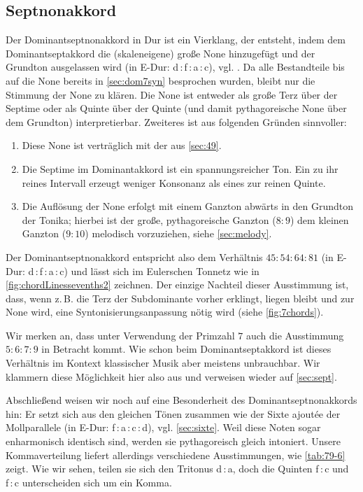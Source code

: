 \subsection{Septnonakkord}
\label{sec:dom79syn}

Der Dominantseptnonakkord in Dur ist ein Vierklang, der entsteht, indem dem
Dominantseptakkord die (skaleneigene) große None hinzugefügt und der Grundton
ausgelassen wird (in \flat E-Dur: d\,:\,f\,:\,\flat a\,:\,c),
vgl. \cite[{}11.3]{Skript}.  Da alle Bestandteile bis auf die None bereits in
\cref{sec:dom7syn} besprochen wurden, bleibt nur die Stimmung der None zu
klären.  Die None ist entweder als große Terz über der Septime oder als Quinte
über der Quinte (und damit pythagoreische None über dem Grundton)
interpretierbar.  Zweiteres ist aus folgenden Gründen sinnvoller:
\begin{enumerate}
  \item Diese None ist verträglich mit der aus \cref{sec:49}.
  \item Die Septime im Dominantakkord ist ein spannungsreicher Ton.  Ein zu ihr
    reines Intervall erzeugt weniger Konsonanz als eines zur reinen Quinte.
  \item Die Auflösung der None erfolgt mit einem Ganzton abwärts in den Grundton
  der Tonika; hierbei ist der große, pythagoreische Ganzton ($8:9$) dem kleinen
  Ganzton ($9:10$) melodisch vorzuziehen, siehe \cref{sec:melody}.
\end{enumerate}
Der Dominantseptnonakkord entspricht also dem Verhältnis $45:54:64:81$ (in \flat
E-Dur: \naturalm d\,:\,f\,:\,\flat a\,:\,c) und lässt sich im Eulerschen Tonnetz
wie in \cref{fig:chordLinessevenths2} zeichnen. Der einzige Nachteil dieser
Ausstimmung ist, dass, wenn z.\,B. die Terz der Subdominante vorher erklingt,
liegen bleibt und zur None wird, eine Syntonisierungsanpassung nötig wird (siehe
\cref{fig:7chords}).

Wir merken an, dass unter Verwendung der Primzahl $7$ auch die Ausstimmung
$5:6:7:9$ in Betracht kommt.  Wie schon beim Dominantseptakkord ist dieses
Verhältnis im Kontext klassischer Musik aber meistens unbrauchbar. Wir klammern
diese Möglichkeit hier also aus und verweisen wieder auf \cref{sec:sept}.

Abschließend weisen wir noch auf eine Besonderheit des Dominantseptnonakkords
hin: Er setzt sich aus den gleichen Tönen zusammen wie der Sixte ajoutée der
Mollparallele (in \flat E-Dur: f\,:\,\flat a\,:\,c\,:\,d),
vgl. \cref{sec:sixte}. Weil diese Noten sogar enharmonisch identisch sind,
werden sie pythagoreisch gleich intoniert. Unsere Kommaverteilung liefert
allerdings verschiedene Ausstimmungen, wie \cref{tab:79-6} zeigt.  Wie wir
sehen, teilen sie sich den Tritonus \naturalm d\,:\,\flat a, doch die Quinten
f\,:\,c und \naturalm f\,:\,\naturalm c unterscheiden sich um ein Komma.

